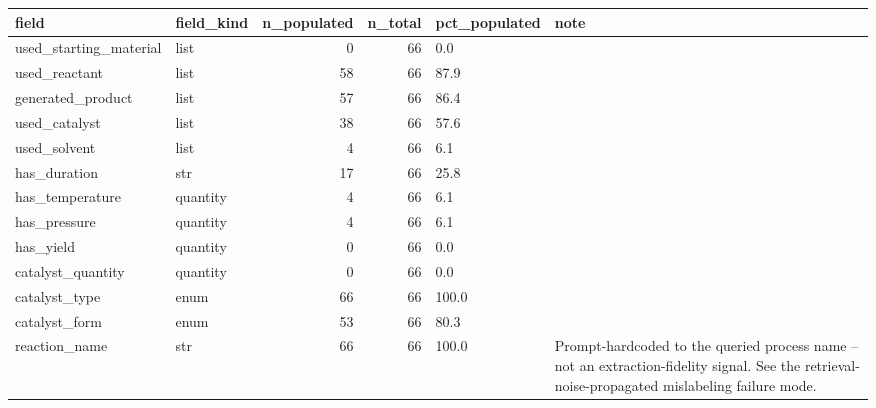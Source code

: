 \begin{tabular}{llrrll}
\toprule
field & field\_kind & n\_populated & n\_total & pct\_populated & note \\
\midrule
used\_starting\_material & list & 0 & 66 & 0.0 &  \\
used\_reactant & list & 58 & 66 & 87.9 &  \\
generated\_product & list & 57 & 66 & 86.4 &  \\
used\_catalyst & list & 38 & 66 & 57.6 &  \\
used\_solvent & list & 4 & 66 & 6.1 &  \\
has\_duration & str & 17 & 66 & 25.8 &  \\
has\_temperature & quantity & 4 & 66 & 6.1 &  \\
has\_pressure & quantity & 4 & 66 & 6.1 &  \\
has\_yield & quantity & 0 & 66 & 0.0 &  \\
catalyst\_quantity & quantity & 0 & 66 & 0.0 &  \\
catalyst\_type & enum & 66 & 66 & 100.0 &  \\
catalyst\_form & enum & 53 & 66 & 80.3 &  \\
reaction\_name & str & 66 & 66 & 100.0 & Prompt-hardcoded to the queried process name -- not an extraction-fidelity signal. See the retrieval-noise-propagated mislabeling failure mode. \\
\bottomrule
\end{tabular}
